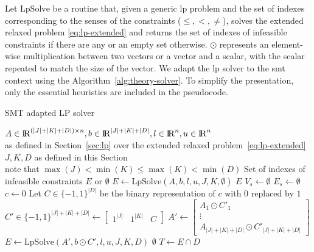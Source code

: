 \documentclass[runningheads]{llncs}
\begin{document}
Let $\text{LpSolve}$ be a routine that, given a generic \gls{lp} problem and the set of indexes corresponding to the senses of the constraints ($\le, <, \ne$), solves the extended relaxed problem \eqref{eq:lp-extended} and returns the set of indexes of infeasible constraints if there are any or an empty set otherwise.
$\odot$ represents an element-wise multiplication between two vectors or a vector and a scalar, with the scalar repeated to match the size of the vector.
We adapt the \gls{lp} solver to the \gls{smt} context using the Algorithm~\ref{alg:theory-solver}.
To simplify the presentation, only the essential heuristics are included in the pseudocode.
\begin{algorithm}
    \caption{SMT adapted LP solver}\label{alg:theory-solver}
    \begin{algorithmic}
        \Require $A \in {\rm I\!R}^{(|J| + |K| + |D|) \times n}, b \in {\rm I\!R}^{|J| + |K| + |D|}, l \in {\rm I\!R}^n, u \in {\rm I\!R}^n$ \\
        \qquad as defined in Section~\ref{sec:lp} over the extended relaxed problem~\eqref{eq:lp-extended}
        \Require $J, K, D$ as defined in this Section \\
        \qquad note that $\max(J) < \min(K) \le \max(K) < \min(D)$
        \Ensure Set of indexes of infeasible constraints $E$ or $\emptyset$
        \State $E \gets \text{LpSolve}(A, b, l, u, J, K, \emptyset)$ 
        \State \Return $E$
        \EndIf
        \State $V_s \gets \emptyset$
        \State $E_s \gets \emptyset$
        \EndFor
        \State $c \gets 0$ 
        \State Let $C \in \{-1, 1\}^{|D|}$ be the binary representation of $c$ with $0$ replaced by $1$
        \State $C' \in \{-1, 1\}^{|J|+|K|+|D|} \gets \begin{bmatrix} 1^{|J|} & 1^{|K|} & C\end{bmatrix}$
        \State $A' \gets \begin{bmatrix}A_1 \odot C'_1 \\ \vdots \\ A_{|J|+|K|+|D|} \odot C'_{|J|+|K|+|D|}\end{bmatrix}$
        \State $E \gets \text{LpSolve}(A', b \odot C', l, u, J, K, D)$
         
        \State \Return $\emptyset$
        \EndIf
        \State $T \gets E \cap D$

\end{algorithmic}
\end{algorithm}
\end{document}
